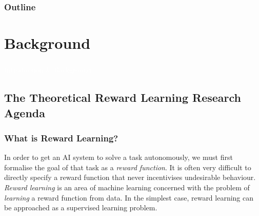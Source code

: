 \documentclass{beamer}
\begin{document}
\newcommand{\Expect}[2]{\mathbb{E}_{#1}\left[{#2}\right]}


\newcommand{\PS}{\mathrm{PS}_\gamma}
\newcommand{\SR}{S'\mathrm{R}_\TransitionDistribution}
\newcommand{\LS}{\mathrm{LS}}
\newcommand{\OPT}{\mathrm{OP}_{\TransitionDistribution,\gamma}}
\newcommand{\Mx}{\mathrm{M}_\mathcal{X}}
\newcommand{\CS}{\mathrm{CS}}

\newcommand{\kPS}[1]{\mathrm{PS}_{\discount,\InitStateDistribution}^{#1}}

\newcommand{\Rspace}{{\hat{\mathcal{R}}}}%

{
    \maketitle
}

\begin{frame}
\frametitle{Outline}
\tiny
\tableofcontents
\end{frame}


\section{Background}
\begin{frame}
    \frametitle{}
    \centering
    \Large
    \textcolor{white}{Introduction \& Background}
\end{frame}

\subsection{The Theoretical Reward Learning Research Agenda}
\begin{frame}
    \frametitle{What is Reward Learning?}
    \small
    In order to get an AI system to solve a task autonomously, we must first formalise the goal of that task as a \emph{reward function}.
    \newline\newline
    It is often very difficult to directly specify a reward function that never incentivises undesirable behaviour.
    \newline\newline
    \emph{Reward learning} is an area of machine learning concerned with the problem of \emph{learning} a reward function from data.
    \newline\newline
    In the simplest case, reward learning can be approached as a supervised learning problem.
\end{frame}
\end{document}

